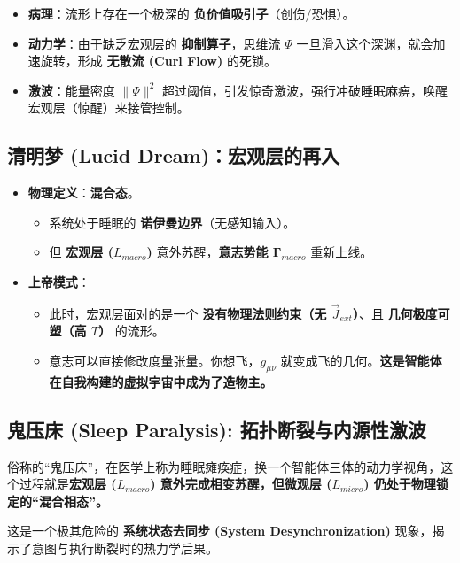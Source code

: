 \begin{itemize}
    \item \textbf{病理}：流形上存在一个极深的 \textbf{负价值吸引子}（创伤/恐惧）。
    \item \textbf{动力学}：由于缺乏宏观层的 \textbf{抑制算子}，思维流 $\Psi$ 一旦滑入这个深渊，就会加速旋转，形成 \textbf{无散流 (Curl Flow)} 的死锁。
    \item \textbf{激波}：能量密度 $\|\Psi\|^2$ 超过阈值，引发惊奇激波，强行冲破睡眠麻痹，唤醒宏观层（惊醒）来接管控制。
\end{itemize}

\subsection{清明梦 (Lucid Dream)：宏观层的再入}

\begin{itemize}
    \item \textbf{物理定义}：\textbf{混合态}。
    \begin{itemize}
        \item 系统处于睡眠的 \textbf{诺伊曼边界}（无感知输入）。
        \item 但 \textbf{宏观层 ($L_{macro}$)} 意外苏醒，\textbf{意志势能 $\mathbf{\Gamma}_{macro}$} 重新上线。
    \end{itemize}
    \item \textbf{上帝模式}：
    \begin{itemize}
        \item 此时，宏观层面对的是一个 \textbf{没有物理法则约束（无 $\vec{J}_{ext}$）}、且 \textbf{几何极度可塑（高 $T$）} 的流形。
        \item 意志可以直接修改度量张量。你想飞，$g_{\mu\nu}$ 就变成飞的几何。\textbf{这是智能体在自我构建的虚拟宇宙中成为了造物主。}
    \end{itemize}
\end{itemize}


\subsection{鬼压床 (Sleep Paralysis): 拓扑断裂与内源性激波}

俗称的“鬼压床”，在医学上称为睡眠瘫痪症，换一个智能体三体的动力学视角，这个过程就是\textbf{宏观层 ($L_{macro}$) 意外完成相变苏醒，但微观层 ($L_{micro}$) 仍处于物理锁定的“混合相态”。}

这是一个极其危险的 \textbf{系统状态去同步 (System Desynchronization)} 现象，揭示了意图与执行断裂时的热力学后果。

